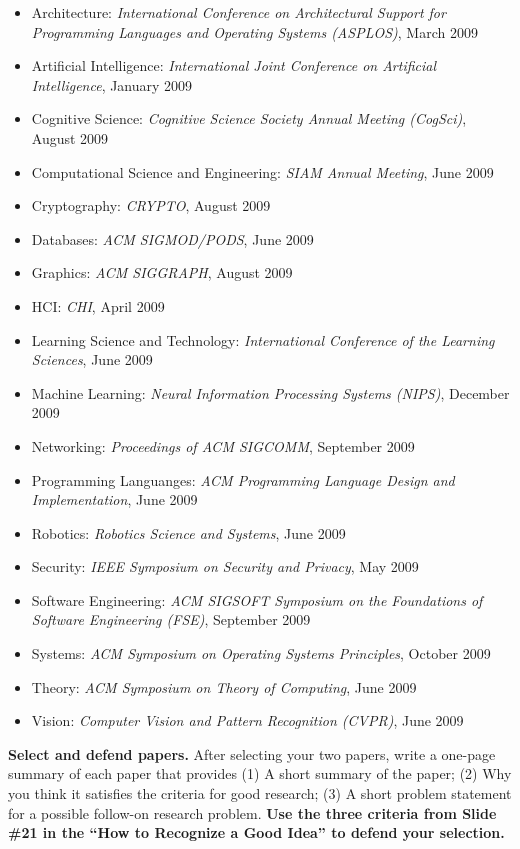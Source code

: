 \documentclass[11pt]{article}
\begin{document}
\begin{itemize}
\itemsep=-1.5pt
\item Architecture: {\em International Conference on
Architectural Support for Programming Languages and Operating Systems
(ASPLOS)}, March 2009
\item Artificial Intelligence: {\em International Joint Conference on
  Artificial Intelligence}, January 2009
\item Cognitive Science: {\em Cognitive Science Society Annual Meeting
  (CogSci)},  August 2009
\item Computational Science and Engineering: {\em SIAM Annual Meeting},
  June 2009
\item Cryptography: {\em CRYPTO}, August 2009
\item Databases: {\em ACM SIGMOD/PODS}, June 2009
\item Graphics: {\em ACM SIGGRAPH}, August 2009
\item HCI: {\em CHI}, April 2009
\item Learning Science and Technology: {\em International Conference of
  the Learning Sciences}, June 2009
\item Machine Learning: {\em Neural Information Processing Systems
  (NIPS)}, December 2009
\item Networking: {\em Proceedings of ACM SIGCOMM}, September 2009
\item Programming Languanges: {\em ACM Programming Language Design and
  Implementation}, June 2009
\item Robotics: {\em Robotics Science and Systems}, June 2009
\item Security: {\em IEEE Symposium on Security and Privacy}, May 2009
\item Software Engineering: {\em ACM SIGSOFT Symposium on the
  Foundations of Software Engineering (FSE)}, September 2009
\item Systems: {\em ACM Symposium on Operating Systems Principles},
  October 2009
\item Theory: {\em ACM Symposium on Theory of Computing}, June 2009
\item Vision: {\em Computer Vision and Pattern Recognition (CVPR)}, June
  2009
\end{itemize}

\noindent
{\bf Select and defend papers.}  After selecting your two papers, write
a one-page summary of each paper that provides (1) A short summary of
the paper; (2) Why you think it satisfies the criteria for good
research; (3) A short problem statement for a possible follow-on
research problem.  {\bf Use the three criteria from Slide \#21 in the
  ``How to Recognize a Good Idea'' to defend your selection.}
\end{document}
